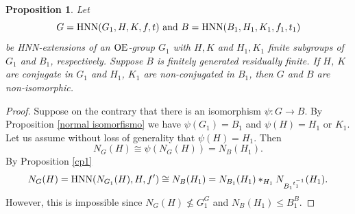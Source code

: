 \documentclass[a4paper,12pt]{article}
\newtheorem{prop}[thm]{Proposition}
\def\OE{{\rm OE}}
\def\hnn {{\rm HNN}}
\begin{document}
{\begin{prop} \label{normal non iso nao normal}
 Let $$G= \hnn(G_1, H, K, f, t)\  {\rm and}\  B=\hnn(B_1, H_1, K_1,f_1, t_1)$$ be HNN-extensions of an $\OE$-group $G_1$ with $H, K$ and $H_1, K_1$ finite subgroups of $G_1$ and $B_1$, respectively. Suppose $B$ is finitely generated residually finite. If $H$, $K$ are  conjugate in $G_1$ and $H_1$, $K_1$ are non-conjugated in $B_1$, then $G$ and $B$ are non-isomorphic. 
\end{prop} 

\begin{proof}
 Suppose on the contrary that there is an isomorphism $\psi: G \longrightarrow B.$ By Proposition \ref{normal isomorfismo} we have $\psi(G_1)=B_1$ and $\psi(H)=H_1 \mbox{ or } K_1.$  Let us assume without loss of generality that $\psi(H)=H_1.$ Then $$N_G(H) \cong \psi\left(N_{G}(H)\right)=N_{B}(H_1).$$ By Proposition \ref{cp1} \begin{equation} \label{cara dos normalizers} N_{G}(H)=\hnn(N_{G_1}(H), H, f') \cong N_{B}(H_1)=N_{B_1}(H_1)*_{H_1
 } N_{{B_1}^{t_{1}^{-1}}}(H_1).\end{equation}However, this is impossible since $N_G(H)\not \leq G_1^G$ and $N_B(H_1)\leq B_1^B$. 
\end{proof}


}
\end{document}
